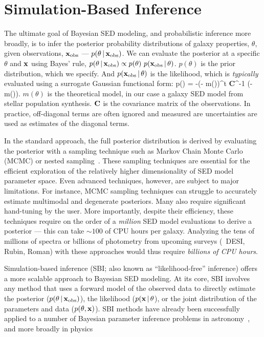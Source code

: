 \section{Simulation-Based Inference} \label{sec:sbi}
The ultimate goal of Bayesian SED modeling, and probabilistic inference more
broadly, is to infer the posterior probability distributions of galaxy
properties, $\theta$, given observations, ${\bf x}_{\rm obs}$  --- $p(\theta\,|\,{\bf x}_{\rm obs})$.
We can evaluate the posterior at a specific $\theta$ and ${\bf x}$ using
Bayes' rule, $p(\theta\,|\,{\bf x}_{\rm obs}) \propto p(\theta)~p({\bf x}_{\rm obs}\,|\,\theta)$. 
$p(\theta)$ is the prior distribution, which we specify. 
And $p({\bf x}_{\rm obs}\,|\,\theta)$ is the likelihood, which is {\em typically}
evaluated using a surrogate Gaussian functional form: 
\beq
    \ln p(\xobs\given\theta) = -(\xobs - m(\theta))^t {\bf C}^{-1}
    (\xobs - m(\theta)).
\eeq
$m(\theta)$ is the theoretical model, in our case a galaxy SED model from
stellar population synthesis.
${\bf C}$ is the covariance matrix of the observations. 
In practice, off-diagonal terms are often ignored and measured are
uncertainties are used as estimates of the diagonal terms. 

In the standard approach, the full posterior distribution is derived by
evaluating the posterior with a sampling technique such as Markov Chain Monte
Carlo (MCMC) or nested sampling~\citep[\eg][]{carnall2017, leja2019a,
tacchella2021}.
These sampling techniques are essential for the efficient exploration of
the relatively higher dimensionality of SED model parameter space.
Even advanced techniques, however, are subject to major limitations.  
For instance, MCMC sampling techniques can struggle to accurately estimate
multimodal and degenerate posteriors. 
Many also require significant hand-tuning by the user.
More importantly, despite their efficiency, these techniques require on the
order of a {\em million} SED model evaluations to derive a posterior --- this
can take ${\sim}100$ of CPU hours per galaxy.
Analyzing the tens of millions of spectra or billions of photometry from
upcoming surveys (\eg~DESI, Rubin, Roman) with these approaches would thus
require {\em billions of CPU hours}.

Simulation-based inference (SBI; also known as ``likelihood-free'' inference)
offers a more scalable approach to Bayesian SED modeling.
At its core, SBI involves any method that uses a forward model of the observed
data to directly estimate the posterior ($p(\theta\,|\,{\bf x}_{\rm obs})$), the
likelihood ($p({\bf x}\,|\, \theta$), or the joint distribution of the
parameters and data ($p(\theta, {\bf x})$). 
SBI methods have already been successfully applied to a number of Bayesian
parameter inference problems in astronomy~\citep[\emph{e.g.}][]{cameron2012, 
weyant2013, hahn2017b, kacprzak2018, alsing2018, wong2020, huppenkothen2021,
zhang2021}, and more broadly in physics~\citep[\emph{e.g.}][]{brehmer2019,
cranmer2020}

